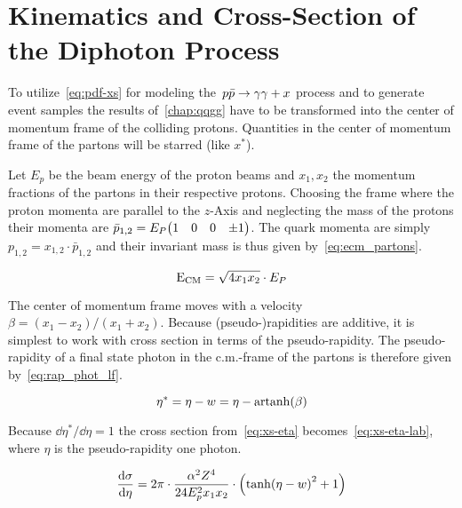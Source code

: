 
\section{Kinematics and Cross-Section of the Diphoton Process}%
\label{sec:lab_xs}

To utilize~\eqref{eq:pdf-xs} for modeling the~\(p\bar{p}\rightarrow\gamma\gamma + x\) process and to
generate event samples the results of~\ref{chap:qqgg} have to be
transformed into the center of momentum frame of the colliding
protons. Quantities in the center of momentum frame of the partons
will be starred (like \(x^\ast\)).

Let \(E_p\) be the beam energy of the proton beams and \(x_1, x_2\)
the momentum fractions of the partons in their respective protons.
Choosing the frame where the proton momenta are parallel to the
\(z\)-Axis and neglecting the mass of the protons their momenta are
\(\bar{p}_{1,2} = E_P \mqty(1 & 0 & 0 & \pm1)\). The quark momenta are
simply \(p_{1,2}=x_{1,2}\cdot\bar{p}_{1,2}\) and their invariant mass
is thus given by~\eqref{eq:ecm_partons}.

\begin{equation}
  \label{eq:ecm_partons}
  \operatorname{E_{\text{CM}}} = \sqrt{4x_1x_2}\cdot E_P
\end{equation}

The center of momentum frame moves with a velocity
\(\beta = (x_1-x_2)/(x_1+x_2)\). Because (pseudo-)rapidities are
additive, it is simplest to work with cross section in terms of the
pseudo-rapidity.  The pseudo-rapidity of a final state photon in the
c.m.-frame of the partons is therefore given
by~\eqref{eq:rap_phot_lf}.

\begin{equation}
  \label{eq:rap_phot_lf}
  \eta^\ast = \eta - w = \eta - \operatorname{artanh}(\beta)
\end{equation}

Because \(\dd{\eta^\ast}/{\dd{\eta}} = 1\) the cross section
from~\eqref{eq:xs-eta} becomes~\eqref{eq:xs-eta-lab}, where \(\eta\) is
the pseudo-rapidity one photon.

\begin{equation}
  \label{eq:xs-eta-lab}
  \dv{\sigma}{\eta} = 2\pi\cdot\frac{\alpha^2Z^4}{24 E_p^2
    x_1x_2}\cdot\qty(\tanh(\eta - w)^2 + 1)
\end{equation}

